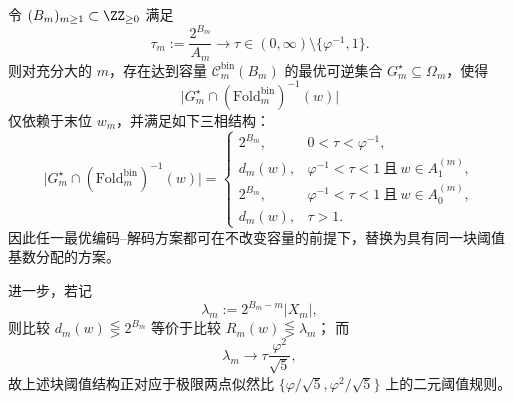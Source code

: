 \begin{theorem}[临界预算下最优预言机反演的块阈值塌缩]\label{thm:conclusion-foldbin-oracle-block-threshold-collapse}
令 \((B_m)_{m\ge 1}\subset\ZZ_{\ge 0}\) 满足
\[
\tau_m:=\frac{2^{B_m}}{A_m}\longrightarrow \tau\in(0,\infty)\setminus\{\varphi^{-1},1\}.
\]
则对充分大的 \(m\)，存在达到容量 \(\mathcal C_m^{\mathrm{bin}}(B_m)\) 的最优可逆集合 \(G_m^\star\subseteq \Omega_m\)，使得
\[
\bigl|G_m^\star\cap (\mathrm{Fold}^{\mathrm{bin}}_m)^{-1}(w)\bigr|
\]
仅依赖于末位 \(w_m\)，并满足如下三相结构：
\[
\bigl|G_m^\star\cap (\mathrm{Fold}^{\mathrm{bin}}_m)^{-1}(w)\bigr|=
\begin{cases}
2^{B_m}, & 0<\tau<\varphi^{-1},\\[4pt]
d_m(w), & \varphi^{-1}<\tau<1\ \text{且}\ w\in A_1^{(m)},\\[4pt]
2^{B_m}, & \varphi^{-1}<\tau<1\ \text{且}\ w\in A_0^{(m)},\\[4pt]
d_m(w), & \tau>1.
\end{cases}
\]
因此任一最优编码--解码方案都可在不改变容量的前提下，替换为具有同一块阈值基数分配的方案。

进一步，若记
\[
\lambda_m:=2^{B_m-m}|X_m|,
\]
则比较
\(
d_m(w)\lesseqgtr 2^{B_m}
\)
等价于比较
\(
R_m(w)\lesseqgtr \lambda_m
\)；
而
\[
\lambda_m\longrightarrow \tau\frac{\varphi^2}{\sqrt5},
\]
故上述块阈值结构正对应于极限两点似然比
\(
\{\varphi/\sqrt5,\varphi^2/\sqrt5\}
\)
上的二元阈值规则。
\end{theorem}
